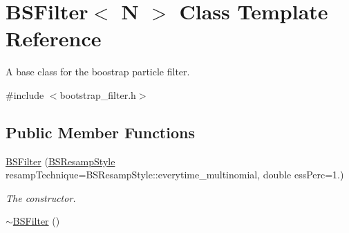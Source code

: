 \hypertarget{classBSFilter}{}\section{B\+S\+Filter$<$ N $>$ Class Template Reference}
\label{classBSFilter}


A base class for the boostrap particle filter.  




{\ttfamily \#include $<$bootstrap\+\_\+filter.\+h$>$}

\subsection*{Public Member Functions}
\begin{DoxyCompactItemize}
\item 
\hyperlink{classBSFilter_a4f94bc98a11cb80763a7bdc1dd86c279}{B\+S\+Filter} (\hyperlink{bootstrap__filter_8h_a476b3b5754056a34ac843629c9570b49}{B\+S\+Resamp\+Style} resamp\+Technique=B\+S\+Resamp\+Style\+::everytime\+\_\+multinomial, double ess\+Perc=1.)
\begin{DoxyCompactList}\small\item\em The constructor. \end{DoxyCompactList}\item 
\hyperlink{classBSFilter_a874cdf362ca780a5afeb4b3da3210244}{$\sim$\+B\+S\+Filter} ()\hypertarget{classBSFilter_a874cdf362ca780a5afeb4b3da3210244}{}\label{classBSFilter_a874cdf362ca780a5afeb4b3da3210244}


\end{DoxyCompactItemize}
